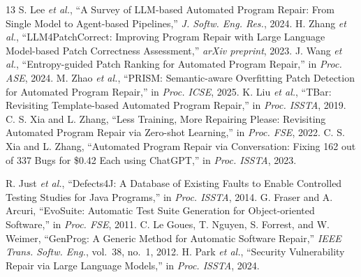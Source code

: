 \documentclass[conference]{IEEEtran}
\begin{document}
\begin{thebibliography}{13}
\footnotesize
{} S. Lee \emph{et al.}, ``A Survey of LLM-based Automated Program Repair: From Single Model to Agent-based Pipelines,'' \emph{J. Softw. Eng. Res.}, 2024.
 H. Zhang \emph{et al.}, ``LLM4PatchCorrect: Improving Program Repair with Large Language Model-based Patch Correctness Assessment,'' \emph{arXiv preprint}, 2023.
 J. Wang \emph{et al.}, ``Entropy-guided Patch Ranking for Automated Program Repair,'' in \emph{Proc. ASE}, 2024.
 M. Zhao \emph{et al.}, ``PRISM: Semantic-aware Overfitting Patch Detection for Automated Program Repair,'' in \emph{Proc. ICSE}, 2025.
 K. Liu \emph{et al.}, ``TBar: Revisiting Template-based Automated Program Repair,'' in \emph{Proc. ISSTA}, 2019.
 C. S. Xia and L. Zhang, ``Less Training, More Repairing Please: Revisiting Automated Program Repair via Zero-shot Learning,'' in \emph{Proc. FSE}, 2022.
 C. S. Xia and L. Zhang, ``Automated Program Repair via Conversation: Fixing 162 out of 337 Bugs for \$0.42 Each using ChatGPT,'' in \emph{Proc. ISSTA}, 2023.

 R. Just \emph{et al.}, ``Defects4J: A Database of Existing Faults to Enable Controlled Testing Studies for Java Programs,'' in \emph{Proc. ISSTA}, 2014.
 G. Fraser and A. Arcuri, ``EvoSuite: Automatic Test Suite Generation for Object-oriented Software,'' in \emph{Proc. FSE}, 2011.
 C. Le Goues, T. Nguyen, S. Forrest, and W. Weimer, ``GenProg: A Generic Method for Automatic Software Repair,'' \emph{IEEE Trans. Softw. Eng.}, vol.~38, no.~1, 2012.
 H. Park \emph{et al.}, ``Security Vulnerability Repair via Large Language Models,'' in \emph{Proc. ISSTA}, 2024.
\end{thebibliography}
\end{document}
